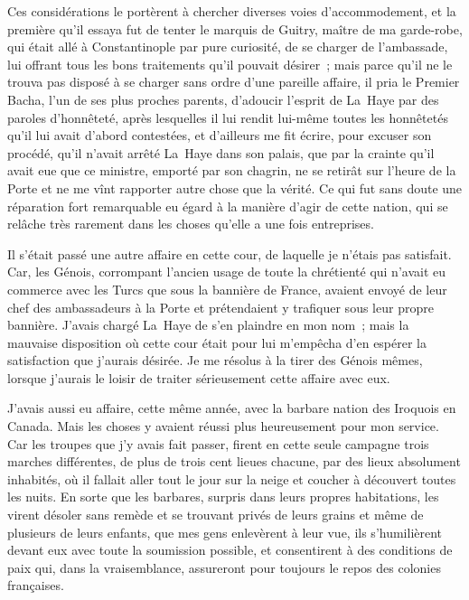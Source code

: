 \documentclass[french,twoside]{book} %
\begin{document}
Ces considérations le portèrent à chercher diverses voies d’accommodement, et la première qu’il essaya fut de tenter le marquis de Guitry, maître de ma garde-robe, qui était allé à Constantinople par pure curiosité, de se charger de l’ambassade, lui offrant tous les bons traitements qu’il pouvait désirer ; mais parce qu’il ne le trouva pas disposé à se charger sans ordre d’une pareille affaire, il pria le Premier Bacha, l’un de ses plus proches parents, d’adoucir l’esprit de La Haye par des paroles d’honnêteté, après lesquelles il lui rendit lui-même toutes les honnêtetés qu’il lui avait d’abord contestées, et d’ailleurs me fit écrire, pour excuser son procédé, qu’il n’avait arrêté La Haye dans son palais, que par la crainte qu’il avait eue que ce ministre, emporté par son chagrin, ne se retirât sur l’heure de la Porte et ne me vînt rapporter autre chose que la vérité. Ce qui fut sans doute une réparation fort remarquable eu égard à la manière d’agir de cette nation, qui se relâche très rarement dans les choses qu’elle a une fois entreprises.\par
Il s’était passé une autre affaire en cette cour, de laquelle je n’étais pas satisfait. Car, les Génois, corrompant l’ancien usage de toute la chrétienté qui n’avait eu commerce avec les Turcs que sous la bannière de France, avaient envoyé de leur chef des ambassadeurs à la Porte et prétendaient y trafiquer sous leur propre bannière. J’avais chargé La Haye de s’en plaindre en mon nom ; mais la mauvaise disposition où cette cour était pour lui m’empêcha d’en espérer la satisfaction que j’aurais désirée. Je me résolus à la tirer des Génois mêmes, lorsque j’aurais le loisir de traiter sérieusement cette affaire avec eux.\par
J’avais aussi eu affaire, cette même année, avec la barbare nation des Iroquois en Canada. Mais les choses y avaient réussi plus heureusement pour mon service. Car les troupes que j’y avais fait passer, firent en cette seule campagne trois marches différentes, de plus de trois cent lieues chacune, par des lieux absolument inhabités, où il fallait aller tout le jour sur la neige et coucher à découvert toutes les nuits. En sorte que les barbares, surpris dans leurs propres habitations, les virent désoler sans remède et se trouvant privés de leurs grains et même de plusieurs de leurs enfants, que mes gens enlevèrent à leur vue, ils s’humilièrent devant eux avec toute la soumission possible, et consentirent à des conditions de paix qui, dans la vraisemblance, assureront pour toujours le repos des colonies françaises.\par
\end{document}
